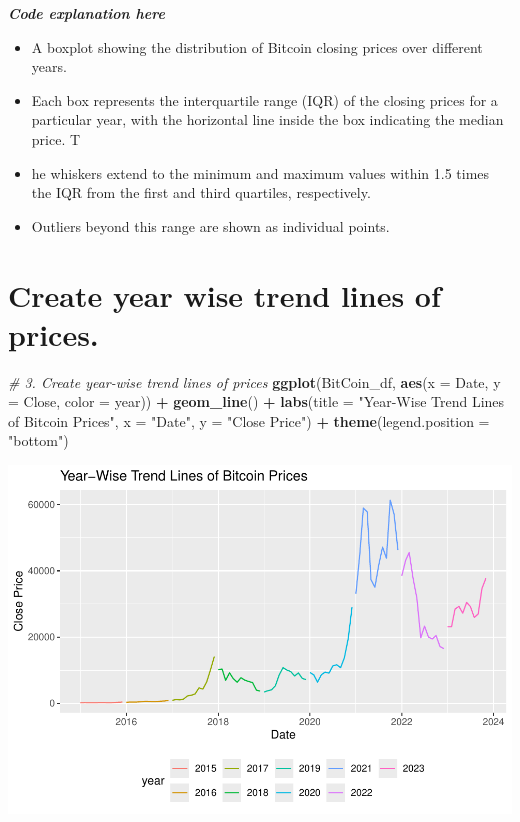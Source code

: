 \documentclass[
]{book}
\newenvironment{Shaded}{\begin{snugshade}}{\end{snugshade}}
\newcommand{\AttributeTok}[1]{\textcolor[rgb]{0.13,0.29,0.53}{#1}}
\newcommand{\CommentTok}[1]{\textcolor[rgb]{0.56,0.35,0.01}{\textit{#1}}}
\newcommand{\FunctionTok}[1]{\textcolor[rgb]{0.13,0.29,0.53}{\textbf{#1}}}
\newcommand{\NormalTok}[1]{#1}
\newcommand{\SpecialCharTok}[1]{\textcolor[rgb]{0.81,0.36,0.00}{\textbf{#1}}}
\newcommand{\StringTok}[1]{\textcolor[rgb]{0.31,0.60,0.02}{#1}}
\providecommand{\tightlist}{%
  \setlength{\itemsep}{0pt}\setlength{\parskip}{0pt}}
\begin{document}
\emph{\textbf{Code explanation here}}

\begin{itemize}
\tightlist
\item
  A boxplot showing the distribution of Bitcoin closing prices over different years.
\item
  Each box represents the interquartile range (IQR) of the closing prices for a particular year, with the horizontal line inside the box indicating the median price. T
\item
  he whiskers extend to the minimum and maximum values within 1.5 times the IQR from the first and third quartiles, respectively.
\item
  Outliers beyond this range are shown as individual points.
\end{itemize}

\section*{Create year wise trend lines of prices.}\label{create-year-wise-trend-lines-of-prices.}

\begin{Shaded}
\begin{Highlighting}[]
\CommentTok{\# 3. Create year{-}wise trend lines of prices}
\FunctionTok{ggplot}\NormalTok{(BitCoin\_df, }\FunctionTok{aes}\NormalTok{(}\AttributeTok{x =}\NormalTok{ Date, }\AttributeTok{y =}\NormalTok{ Close, }\AttributeTok{color =}\NormalTok{ year)) }\SpecialCharTok{+}
  \FunctionTok{geom\_line}\NormalTok{() }\SpecialCharTok{+}
  \FunctionTok{labs}\NormalTok{(}\AttributeTok{title =} \StringTok{"Year{-}Wise Trend Lines of Bitcoin Prices"}\NormalTok{, }\AttributeTok{x =} \StringTok{"Date"}\NormalTok{, }\AttributeTok{y =} \StringTok{"Close Price"}\NormalTok{) }\SpecialCharTok{+}
  \FunctionTok{theme}\NormalTok{(}\AttributeTok{legend.position =} \StringTok{"bottom"}\NormalTok{)}
\end{Highlighting}
\end{Shaded}

\includegraphics{bookdown-demo_files/figure-latex/unnamed-chunk-11-1.pdf}
\end{document}
